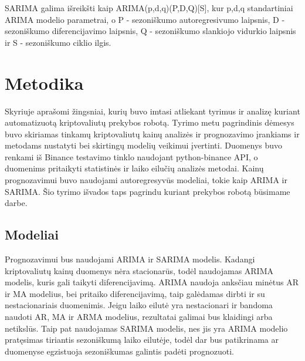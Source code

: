 \documentclass{VUMIFInfKursinis}
\begin{document}
SARIMA galima išreikšti kaip ARIMA(p,d,q)(P,D,Q)[S], kur p,d,q standartiniai ARIMA modelio parametrai, o P - sezoniškumo autoregresivumo laipsnis,
D - sezoniškumo diferencijavimo laipsnis, Q - sezoniškumo slankiojo vidurkio laipsnis ir S - sezoniškumo ciklio ilgis. 

\section{Metodika}

Skyriuje aprašomi žingsniai, kurių buvo imtasi atliekant tyrimus ir analizę kuriant automatizuotą kriptovaliutų prekybos robotą. 
Tyrimo metu pagrindinis dėmesys buvo skiriamas tinkamų kriptovaliutų kainų analizės ir prognozavimo įrankiams ir metodams nustatyti bei skirtingų modelių veikimui įvertinti. 
Duomenys buvo renkami iš Binance testavimo tinklo naudojant python-binance API, o duomenims pritaikyti statistinės ir laiko eilučių analizės metodai. 
Kainų prognozavimui buvo naudojami autoregresyvūs modeliai, tokie kaip ARIMA ir SARIMA. 
Šio tyrimo išvados taps pagrindu kuriant prekybos robotą būsimame darbe.


\subsection{Modeliai}
Prognozavimui bus naudojami ARIMA ir SARIMA modelis. Kadangi kriptovaliutų kainų duomenys nėra stacionarūs, todėl naudojamas ARIMA modelis, kuris gali taikyti diferencijavimą.
ARIMA naudoja anksčiau minėtus AR ir MA modelius, bei pritaiko diferencijavimą, taip galėdamas dirbti ir su nestacionariais duomenimis. 
Jeigu laiko eilutė yra nestacionari ir bandoma naudoti AR, MA ir ARMA modelius, rezultatai galimai bus klaidingi arba netikslūs.
Taip pat naudojamas SARIMA modelis, nes jis yra ARIMA modelio pratęsimas tiriantis sezoniškumą laiko eilutėje, todėl dar bus patikrinama ar duomenyse egzistuoja sezoniškumas
galintis padėti prognozuoti.

\end{document}
